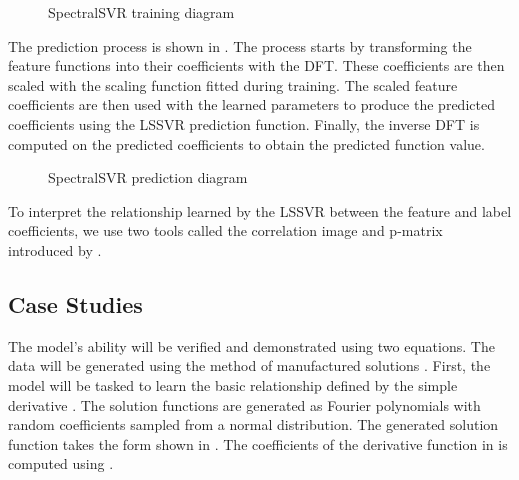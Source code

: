 \documentclass[preprint,12pt,times,authoryear]{elsarticle}
\begin{document}
\begin{figure}[H]
  \centering
  \caption{SpectralSVR training diagram}\label{fig:spectralsvr_training}
\end{figure}

The prediction process is shown in . The process starts by transforming the feature functions into their coefficients with the DFT\@. These coefficients are then scaled with the scaling function fitted during training. The scaled feature coefficients are then used with the learned parameters to produce the predicted coefficients using the LSSVR prediction function. Finally, the inverse DFT is computed on the predicted coefficients to obtain the predicted function value.
\begin{figure}[H]
  \centering
  \caption{SpectralSVR prediction diagram}\label{fig:spectralsvr_prediction}
\end{figure}

To interpret the relationship learned by the LSSVR between the feature and label coefficients, we use two tools called the correlation image and p-matrix introduced by \citet{ustunVisualisationInterpretationSupport2007}.

\subsection{Case Studies}
The model's ability will be verified and demonstrated using two equations. The data will be generated using the method of manufactured solutions \citep{roacheCodeVerificationMethod2002,salariCodeVerificationMethod2000,vedovotoApplicationMethodManufactured2011}. First, the model will be tasked to learn the basic relationship defined by the simple derivative . The solution functions are generated as Fourier polynomials with random coefficients sampled from a normal distribution. The generated solution function takes the form shown in . The coefficients of the derivative function in  is computed using .
\end{document}
